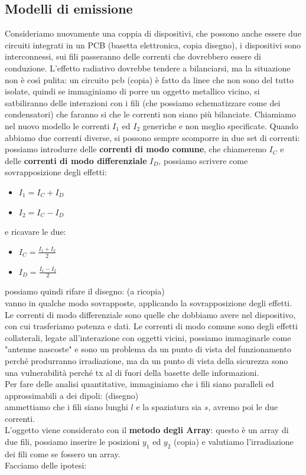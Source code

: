 \documentclass[oneside, 12pt]{extbook}
\begin{document}
\subsection{Modelli di emissione}
Consideriamo nuovamente una coppia di dispositivi, che possono anche essere due circuiti integrati in un PCB (basetta elettronica, copia disegno), i dispositivi sono interconnessi, sui fili passeranno delle correnti che dovrebbero essere di conduzione. L'effetto radiativo dovrebbe tendere a bilanciarsi, ma la situazione non è così pulita: un circuito pcb (copia) è fatto da linee che non sono del tutto isolate, quindi se immaginiamo di porre un oggetto metallico vicino, si satbiliranno delle interazioni con i fili (che possiamo schematizzare come dei condensatori) che faranno si che le correnti non siano più bilanciate. Chiamiamo nel nuovo modello le correnti $I_1$ ed $I_2$ generiche e non meglio specificate. Quando abbiamo due correnti diverse, si possono sempre scomporre in due set di correnti: possiamo introdurre delle \textbf{correnti di modo comune}, che chiameremo $I_C$ e delle \textbf{correnti di modo differenziale} $I_D$, possiamo scrivere come sovrapposizione degli effetti:
\begin{itemize}
	\item $I_1 = I_C + I_D$
	\item $I_2 = I_C - I_D$
\end{itemize}
e ricavare le due:
\begin{itemize}
	\item $I_C = \frac{I_1 + I_2}{2}$
	\item $I_D = \frac{I_1 - I_2}{2}$
\end{itemize}
possiamo quindi rifare il disegno: (a ricopia)\\vanno in qualche modo sovrapposte, applicando la sovrapposizione degli effetti.\\Le correnti di modo differenziale sono quelle che dobbiamo avere nel dispositivo, con cui trasferiamo potenza e dati. Le correnti di modo comune sono degli effetti collaterali, legate all'interazione con oggetti vicini, possiamo immaginarle come "antenne nascoste" e sono un problema da un punto di vista del funzionamento perché produrranno irradiazione, ma da un punto di vista della sicurezza sono una vulnerabilità perché tx al di fuori della basette delle informazioni.\\Per fare delle analisi quantitative, immaginiamo che i fili siano paralleli ed approssimabili a dei dipoli:
(disegno)\\ammettiamo che i fili siano lunghi $l$ e la spaziatura sia $s$, avremo poi le due correnti.\\L'oggetto viene considerato con il \textbf{metodo degli Array}: questo è un array di due fili, possiamo inserire le posizioni $y_1$ ed $y_2$ (copia) e valutiamo l'irradiazione dei fili come se fossero un array.\\Facciamo delle ipotesi:
\end{document}
